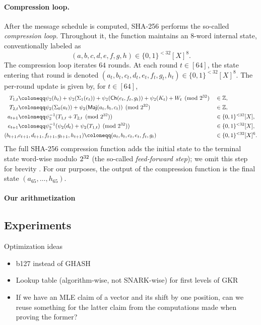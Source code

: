 \documentclass[11pt,letterpaper,usenames,dvipsnames]{article}
\begin{document}
\paragraph{Compression loop.}
After the message schedule is computed, SHA-256 performs the so-called \emph{compression loop}. Throughout it, the function maintains an $8$-word internal state, conventionally labeled as $$(a,b,c,d,e,f,g,h) \in \{0,1\}^{<32}[X]^8.$$
The compression loop iterates $64$ rounds.
At each round $t\in[64]$, the state entering that round is denoted
$(a_t,b_t,c_t,d_t,e_t,f_t,g_t,h_t)\in\{0,1\}^{<32}[X]^8$. The per-round update is given by, for $t\in [64]$,
\begin{equation*}
\begin{aligned}
T_{1,t} &\coloneqq \psi_2(h_t)+\psi_2(\Sigma_1(e_t))+\psi_2(\Ch(e_t,f_t,g_t))+\psi_2(K_t)+W_t  \pmod{2^\wordsize} &&\in \ZZ,\\
T_{2,t} &\coloneqq \psi_2(\Sigma_0(a_t))+\psi_2(\Maj(a_t,b_t,c_t))  \pmod{2^\wordsize} &&\in \ZZ,\\
a_{t+1} &\coloneqq \psi_2^{-1}(T_{1,t}+T_{2,t} \pmod{2^\wordsize}) &&\in\{0,1\}^{<32}[X],\\
e_{t+1} &\coloneqq \psi_2^{-1}(\psi_2(d_t)+\psi_2(T_{1,t}) \pmod{2^\wordsize}) &&\in \{0,1\}^{<32}[X],\\
(b_{t+1},&c_{t+1},d_{t+1},f_{t+1},g_{t+1},h_{t+1}) 
\coloneqq (a_t,b_t,c_t,e_t,f_t,g_t)&&\in\{0,1\}^{<32}[X]^6.
\end{aligned}
\end{equation*}
The full SHA-256 compression function adds the initial state to the terminal state word-wise modulo $2^{32}$ (the so-called \emph{feed-forward step}); we omit this step for brevity . For our purposes, the output of the compression function is the final state $(a_{65},\ldots,h_{65})$.  

\paragraph{Our arithmetization}

\subsection{Experiments}


Optimization ideas
\begin{itemize}
    \item b127 instead of GHASH
    \item Lookup table (algorithm-wise, not SNARK-wise) for first levels of GKR
    \item If we have an MLE claim of a vector and its shift by one position, can we reuse something for the latter claim from the computations made when proving the former?
\end{itemize}
\end{document}
